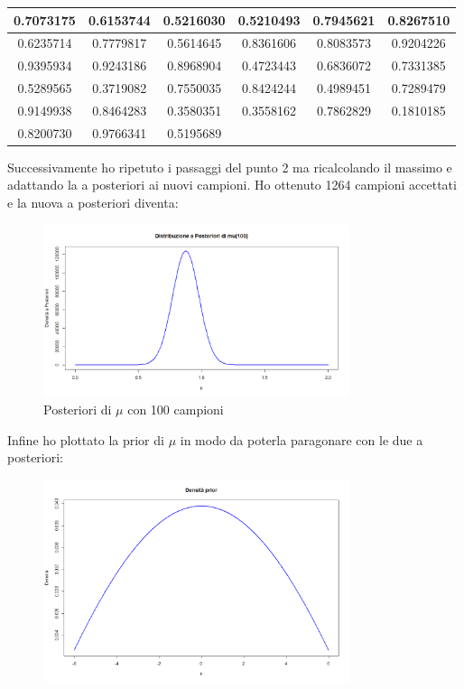 \documentclass[a4paper,12pt]{article}
\begin{document}
\begin{itemize}
\begin{center}
\begin{tabular}{|c|c|c|c|c|c|}
			\hline
			0.7073175 & 0.6153744 & 0.5216030 & 0.5210493 & 0.7945621 & 0.8267510 \\
			\hline
			0.6235714 & 0.7779817 & 0.5614645 & 0.8361606 & 0.8083573 & 0.9204226 \\
			\hline
			0.9395934 & 0.9243186 & 0.8968904 & 0.4723443 & 0.6836072 & 0.7331385 \\
			\hline
			0.5289565 & 0.3719082 & 0.7550035 & 0.8424244 & 0.4989451 & 0.7289479 \\
			\hline
			0.9149938 & 0.8464283 & 0.3580351 & 0.3558162 & 0.7862829 & 0.1810185 \\
			\hline
			0.8200730 & 0.9766341 & 0.5195689 & & & \\
			\hline
		\end{tabular}
	\end{center}
	Successivamente ho ripetuto i passaggi del punto 2 ma ricalcolando il massimo e adattando la a posteriori ai nuovi campioni.
	Ho ottenuto 1264 campioni accettati e la nuova a posteriori diventa:
	\begin{figure}[h] %
		\centering %
		\includegraphics[width=0.8\textwidth]{newpost.png} %
		\caption{Posteriori di $\mu$ con 100 campioni} %
		\label{fig:immagine} %
	\end{figure}
	\newpage
	Infine ho plottato la prior di $\mu$ in modo da poterla paragonare con le due a posteriori:
	\begin{figure}[h] %
		\centering %
		\includegraphics[width=0.8\textwidth]{prior.png} %

\end{figure}
\end{itemize}
\end{document}
